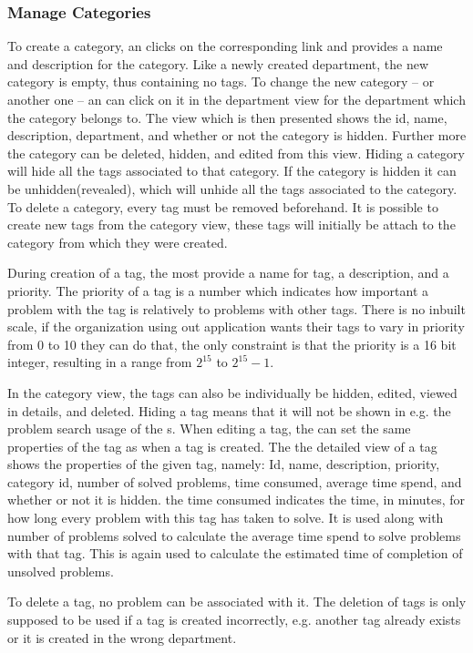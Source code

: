 \subsubsection{Manage Categories}
To create a category, an \admin[] clicks on the corresponding link and provides a name and description for the category.
Like a newly created department, the new category is empty, thus containing no tags.
To change the new category -- or another one -- an \admin[] can click on it in the department view for the department which the category belongs to.
The view which is then presented shows the id, name, description, department, and whether or not the category is hidden.
Further more the category can be deleted, hidden, and edited from this view.
Hiding a category will hide all the tags associated to that category.
If the category is hidden it can be unhidden(revealed), which will unhide all the tags associated to the category.
To delete a category, every tag must be removed beforehand.
It is possible to create new tags from the category view, these tags will initially be attach to the category from which they were created.

During creation of a tag, the \admin[] most provide a name for tag, a description, and a priority.
The priority of a tag is a number which indicates how important a problem with the tag is relatively to problems with other tags.
There is no inbuilt scale, if the organization using out application wants their tags to vary in priority from 0 to 10 they can do that, the only constraint is that the priority is a 16 bit integer, resulting in a range from $2^{15}$ to $2^{15}-1$.

In the category view, the tags can also be individually be hidden, edited, viewed in details, and deleted.
Hiding a tag means that it will not be shown in e.g. the problem search usage of the \aclient[]s.
When editing a tag, the \admin[]can set the same properties of the tag as when a tag is created.
The the detailed view of a tag shows the properties of the given tag, namely: Id, name, description, priority, category id, number of solved problems, time consumed, average time spend, and whether or not it is hidden.
the time consumed indicates the time, in minutes, for how long every problem with this tag has taken to solve.
It is used along with number of problems solved to calculate the average time spend to solve problems with that tag.
This is again used to calculate the estimated time of completion of unsolved problems.

To delete a tag, no problem can be associated with it.
The deletion of tags is only supposed to be used if a tag is created incorrectly, e.g. another tag already exists or it is created in the wrong department.

